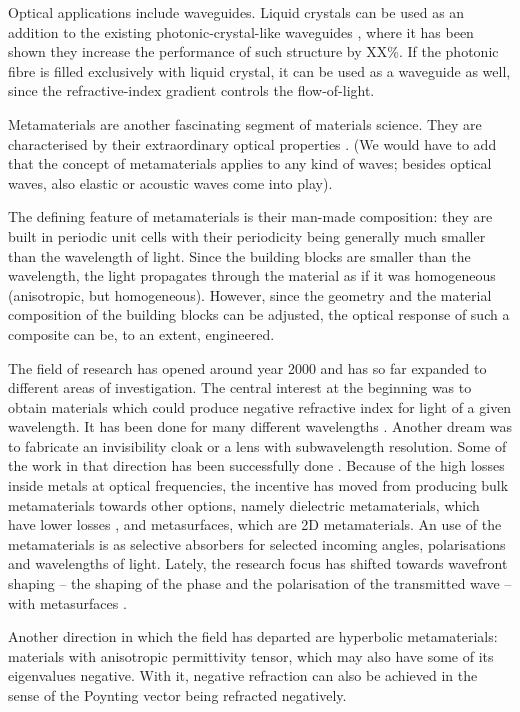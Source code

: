 \documentclass[a4paper,11pt]{article}
\begin{document}
Optical applications include waveguides. 
Liquid crystals can be used as an addition to the existing photonic-crystal-like waveguides \cite{dd}, where it has been shown they increase the performance of such structure by XX\%. 
If the photonic fibre is filled exclusively with liquid crystal, it can be used as a waveguide as well, since the refractive-index gradient controls the flow-of-light. 





Metamaterials are another fascinating segment of materials science. 
They are characterised by their extraordinary optical properties \cite{gja}.
(We would have to add that the concept of metamaterials applies to any kind of waves; besides optical waves, also elastic or acoustic waves come into play). 

The defining feature of metamaterials is their man-made composition: they are built in periodic unit cells with their periodicity being generally much smaller than the wavelength of light. 
Since the building blocks are smaller than the wavelength, the light propagates through the material as if it was homogeneous (anisotropic, but homogeneous). 
However, since the geometry and the material composition of the building blocks can be adjusted, the optical response of such a composite can be, to an extent, engineered. 

The field of research has opened around year 2000 \cite{koak} and has so far expanded to different areas of investigation. 
The central interest at the beginning was to obtain materials which could produce negative refractive index for light of a given wavelength. 
It has been done for many different wavelengths \cite{pwqo}. 
Another dream was to fabricate an invisibility cloak or a lens with subwavelength resolution. 
Some of the work in that direction has been successfully done \cite{lal, ei}. 
Because of the high losses inside metals at optical frequencies, the incentive has moved from producing bulk metamaterials towards other options, namely dielectric metamaterials, which have lower losses \cite{}, and metasurfaces, which are 2D metamaterials. 
An use of the metamaterials is as selective absorbers for selected incoming angles, polarisations and wavelengths of light. 
Lately, the research focus has shifted towards wavefront shaping -- the shaping of the phase and the polarisation of the transmitted wave -- with metasurfaces \cite{}.  

Another direction in which the field has departed are hyperbolic metamaterials: materials with anisotropic permittivity tensor, which may also have some of its eigenvalues negative. 
With it, negative refraction can also be achieved in the sense of the Poynting vector being refracted negatively.
\end{document}
